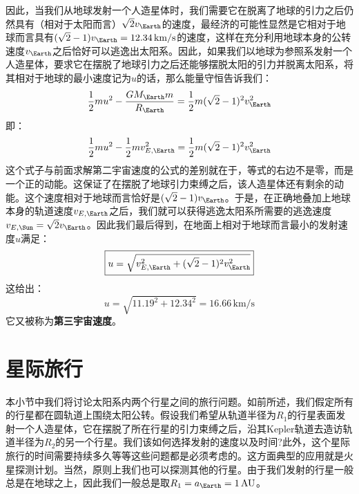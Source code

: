 \documentclass[a4paper,openany]{book}
\begin{document}
因此，当我们从地球发射一个人造星体时，我们需要它在脱离了地球的引力之后仍然具有（相对于太阳而言）$\sqrt{2}v_{\Earth}$的速度，最经济的可能性显然是它相对于地球而言具有$(\sqrt{2}-1)v_{\Earth} = 12.34\,\mathrm{km/s}$的速度，这样在充分利用地球本身的公转速度$v_{\Earth}$之后恰好可以逃逸出太阳系。因此，如果我们以地球为参照系发射一个人造星体，要求它在摆脱了地球引力之后还能够摆脱太阳的引力并脱离太阳系，将其相对于地球的最小速度记为$u$的话，那么能量守恒告诉我们：
\[
    \frac{1}{2}mu^2 - \frac{GM_{\Earth}m}{R_{\Earth}} = \frac{1}{2}m(\sqrt{2}-1)^2 v_{\Earth}^2
\]
即：
\[
    \frac{1}{2}mu^2 - \frac{1}{2}mv_{E,\Earth}^2 = \frac{1}{2}m(\sqrt{2}-1)^2 v_{\Earth}^2
\]
这个式子与前面求解第二宇宙速度的公式的差别就在于，等式的右边不是零，而是一个正的动能。这保证了在摆脱了地球引力束缚之后，该人造星体还有剩余的动能。这个速度相对于地球而言恰好是$(\sqrt{2}-1)v_{\Earth}$。于是，在正确地叠加上地球本身的轨道速度$v_{E,\Earth}$之后，我们就可以获得逃逸太阳系所需要的逃逸速度$v_{E,\Sun} = \sqrt{2}v_{\Earth}$。因此我们最后得到，在地面上相对于地球而言最小的发射速度$u$满足：
\[
    \boxed{u = \sqrt{v_{E,\Earth}^2 + (\sqrt{2}-1)^2 v_{\Earth}^2}}
\]
这给出：
\[
    u = \sqrt{11.19^2 + 12.34^2} = 16.66\,\mathrm{km/s}
\]
它又被称为\textbf{第三宇宙速度}。

\chapter*{星际旅行}

本小节中我们将讨论太阳系内两个行星之间的旅行问题。如前所述，我们假定所有的行星都在圆轨道上围绕太阳公转。假设我们希望从轨道半径为$R_1$的行星表面发射一个人造星体，它在摆脱了所在行星的引力束缚之后，沿其Kepler轨道去造访轨道半径为$R_2$的另一个行星。我们该如何选择发射的速度以及时间?此外，这个星际旅行的时间需要持续多久等等这些问题都是必须考虑的。这方面典型的应用就是火星探测计划。当然，原则上我们也可以探测其他的行星。由于我们发射的行星一般总是在地球之上，因此我们一般总是取$R_1 = a_{\Earth} = 1\,\mathrm{AU}$。
\end{document}
